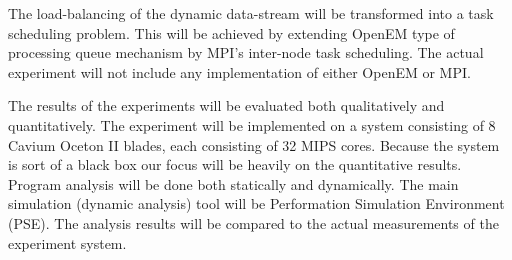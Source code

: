 The load-balancing of the dynamic data-stream will be transformed into a task scheduling problem. This will be achieved by extending OpenEM type of processing queue mechanism by MPI's inter-node task scheduling. The actual experiment will not include any implementation of either OpenEM or MPI.

The results of the experiments will be evaluated both qualitatively and quantitatively. The experiment will be implemented on a system consisting of 8 Cavium Oceton II blades, each consisting of 32 MIPS cores. Because the system is sort of a black box our focus will be heavily on the quantitative results. Program analysis will be done both statically and dynamically. The main simulation (dynamic analysis) tool will be Performation Simulation Environment (PSE). The analysis results will be compared to the actual measurements of the experiment system.

